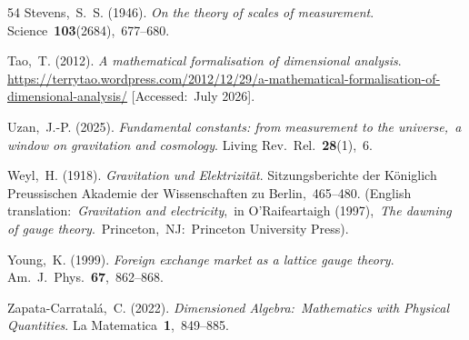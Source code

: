 \documentclass[12pt]{article}
\numberwithin{equation}{section}
\begin{document}
\begin{small}
\begin{thebibliography}{54}
{Stevens,~S.~S.} (1946).
{\em On the theory of scales of measurement}.
Science~\textbf{103}(2684),~677--680.

{Tao,~T.} (2012).
{\em A mathematical formalisation of dimensional analysis}.\\
\href{https://terrytao.wordpress.com/2012/12/29/a-mathematical-formalisation-of-dimensional-analysis/}{https://terrytao.wordpress.com/2012/12/29/a-mathematical-formalisation-of-dimensional-analysis/} [Accessed:~July 2026].

{Uzan,~J.-P.} (2025).
{\em Fundamental constants: from measurement to the universe,~a window on gravitation and cosmology}.
Living Rev.~Rel.~\textbf{28}(1),~6.

{Weyl,~H.} (1918).
{\em Gravitation und Elektrizit\"at}.
Sitzungsberichte der K\"oniglich Preussischen Akademie der Wissenschaften zu Berlin,~465--480.
(English translation:~{\em Gravitation and electricity},~in O'Raifeartaigh (1997),~{\em The dawning of gauge theory}.~Princeton,~NJ:~Princeton University Press).

{Young,~K.} (1999).
{\em Foreign exchange market as a lattice gauge theory}.
Am.~J.~Phys.~\textbf{67},~862--868.

{Zapata-Carratal\'a,~C.} (2022).
{\em Dimensioned Algebra:~Mathematics with Physical Quantities}.
La Matematica~\textbf{1},~849--885.

\end{thebibliography}

\end{small} %
\end{document}
